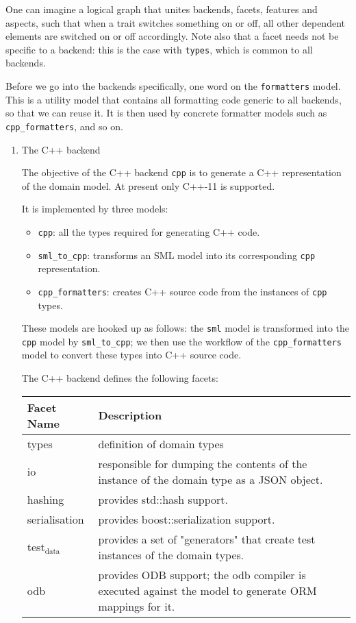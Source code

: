 \documentclass[11pt]{article}
\begin{document}
\begin{enumerate}
\begin{enumerate}
One can imagine a logical graph that unites backends, facets, features
and aspects, such that when a trait switches something on or off, all
other dependent elements are switched on or off accordingly. Note also
that a facet needs not be specific to a backend: this is the case with
\texttt{types}, which is common to all backends.

Before we go into the backends specifically, one word on the
\texttt{formatters} model. This is a utility model that contains all
formatting code generic to all backends, so that we can reuse it. It
is then used by concrete formatter models such as \texttt{cpp\_formatters},
and so on.

\begin{enumerate}
\item The C++ backend
\label{sec-2-2-1-2-3-1}

The objective of the C++ backend \texttt{cpp} is to generate a C++
representation of the domain model. At present only C++-11 is
supported.

It is implemented by three models:

\begin{itemize}
\item \texttt{cpp}: all the types required for generating C++ code.
\item \texttt{sml\_to\_cpp}: transforms an SML model into its corresponding \texttt{cpp}
  representation.
\item \texttt{cpp\_formatters}: creates C++ source code from the instances of
\texttt{cpp} types.
\end{itemize}

These models are hooked up as follows: the \texttt{sml} model is transformed
into the \texttt{cpp} model by \texttt{sml\_to\_cpp}; we then use the workflow of the
\texttt{cpp\_formatters} model to convert these types into C++ source code.

The C++ backend defines the following facets:

\begin{center}
\begin{tabular}{ll}
Facet Name & Description\\
\hline
types & definition of domain types\\
io & responsible for dumping the contents of the instance of the domain type as a JSON object.\\
hashing & provides std::hash support.\\
serialisation & provides boost::serialization support.\\
test$_{\text{data}}$ & provides a set of "generators" that create test instances of the domain types.\\
odb & provides ODB support; the odb compiler is executed against the model to generate ORM mappings for it.\\
\end{tabular}
\end{center}


\end{enumerate}
\end{enumerate}
\end{enumerate}
\end{document}

